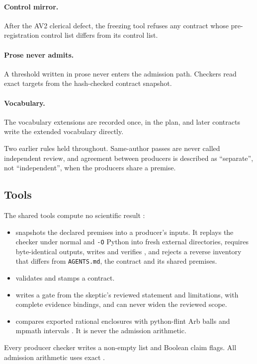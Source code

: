 \paragraph{Control mirror.}
After the AV2 clerical defect, the freezing tool refuses any contract whose
pre-registration control list differs from its control list.

\paragraph{Prose never admits.}
A threshold written in prose never enters the admission path. Checkers read
exact targets from the hash-checked contract snapshot.

\paragraph{Vocabulary.}
The vocabulary extensions are recorded once, in the plan, and later contracts
write the extended vocabulary directly.

Two earlier rules held throughout. Same-author passes are never called
independent review, and agreement between producers is described as
``separate'', not ``independent'', when the producers share a premise.

\subsection{Tools}
\label{sec:history-tools}
The shared tools compute no scientific result \cite{r32contracts}:
\begin{itemize}
\item {} snapshots the declared premises into a producer's
inputs. It replays the checker under normal and \texttt{-O} Python into fresh
external directories, requires byte-identical outputs, writes and verifies
, and rejects a reverse inventory that differs from
\texttt{AGENTS.md}, the contract and its shared premises.
\item {} validates and stamps a contract.
\item {} writes a gate from the skeptic's reviewed
statement and limitations, with complete evidence bindings, and can never
widen the reviewed scope.
\item {} compares exported rational enclosures
with python-flint Arb balls and mpmath intervals \cite{flint,mpmath}. It is
never the admission arithmetic.
\end{itemize}
Every producer checker writes a non-empty  list and
Boolean claim flags. All admission arithmetic uses exact
.

